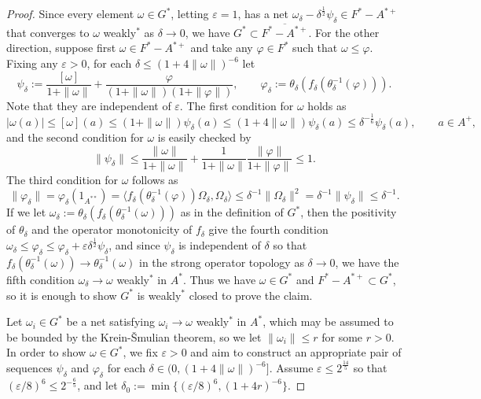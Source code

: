 \documentclass[noamsfonts,a4paper,10pt]{amsart}
\theoremstyle{plain}
\theoremstyle{definition}
\theoremstyle{remark}
\begin{document}
\begin{proof}
Since every element $\omega\in G^*$, letting $\varepsilon=1$, has a net $\omega_\delta-\delta^{\frac12}\psi_\delta\in F^*-A^{*+}$ that converges to $\omega$ weakly$^*$ as $\delta\to0$, we have $G^*\subset\overline{F^*-A^{*+}}$.
For the other direction, suppose first $\omega\in F^*-A^{*+}$ and take any $\varphi\in F^*$ such that $\omega\le\varphi$.
Fixing any $\varepsilon>0$, for each $\delta\le(1+4\|\omega\|)^{-6}$ let
\[\psi_\delta:=\frac{[\omega]}{1+\|\omega\|}+\frac\varphi{(1+\|\omega\|)(1+\|\varphi\|)},\qquad\varphi_\delta:=\theta_\delta(f_\delta(\theta_\delta^{-1}(\varphi))).\]
Note that they are independent of $\varepsilon$.
The first condition for $\omega$ holds as
\[|\omega(a)|\le[\omega](a)\le(1+\|\omega\|)\psi_\delta(a)\le(1+4\|\omega\|)\psi_\delta(a)\le\delta^{-\frac16}\psi_\delta(a),\qquad a\in A^+,\]
and the second condition for $\omega$ is easily checked by
\[\|\psi_\delta\|\le\frac{\|\omega\|}{1+\|\omega\|}+\frac1{1+\|\omega\|}\frac{\|\varphi\|}{1+\|\varphi\|}\le1.\]
The third condition for $\omega$ follows as
\[\|\varphi_\delta\|=\varphi_\delta(1_{A^{**}})=\langle f_\delta(\theta_\delta^{-1}(\varphi))\Omega_\delta,\Omega_\delta\rangle\le\delta^{-1}\|\Omega_\delta\|^2=\delta^{-1}\|\psi_\delta\|\le\delta^{-1}.\]
If we let $\omega_\delta:=\theta_\delta(f_\delta(\theta_\delta^{-1}(\omega)))$ as in the definition of $G^*$, then the positivity of $\theta_\delta$ and the operator monotonicity of $f_\delta$ give the fourth condition $\omega_\delta\le\varphi_\delta\le\varphi_\delta+\varepsilon\delta^{\frac12}\psi_\delta$, and since $\psi_\delta$ is independent of $\delta$ so that $f_\delta(\theta_\delta^{-1}(\omega))\to\theta_\delta^{-1}(\omega)$ in the strong operator topology as $\delta\to0$, we have the fifth condition $\omega_\delta\to\omega$ weakly$^*$ in $A^*$.
Thus we have $\omega\in G^*$ and $F^*-A^{*+}\subset G^*$, so it is enough to show $G^*$ is weakly$^*$ closed to prove the claim.

Let $\omega_i\in G^*$ be a net satisfying $\omega_i\to\omega$ weakly$^*$ in $A^*$, which may be assumed to be bounded by the Krein-\v Smulian theorem, so we let $\|\omega_i\|\le r$ for some $r>0$.
In order to show $\omega\in G^*$, we fix $\varepsilon>0$ and aim to construct an appropriate pair of sequences $\psi_\delta$ and $\varphi_\delta$ for each $\delta\in(0,(1+4\|\omega\|)^{-6}]$.
Assume $\varepsilon\le2^{\frac{14}5}$ so that $(\varepsilon/8)^6\le2^{-\frac65}$, and let $\delta_0:=\min\{(\varepsilon/8)^6,(1+4r)^{-6}\}$.


\end{proof}
\end{document}
